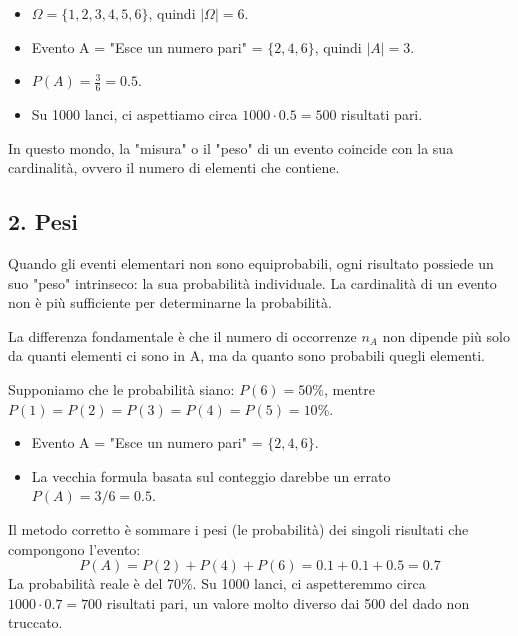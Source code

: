 \begin{esempio}
    \begin{itemize}
        \item \(\Omega = \{1, 2, 3, 4, 5, 6\}\), quindi \(|\Omega| = 6\).
        \item Evento A = "Esce un numero pari" = \(\{2, 4, 6\}\), quindi \(|A| = 3\).
        \item \(P(A) = \frac{3}{6} = 0.5\).
        \item Su 1000 lanci, ci aspettiamo circa \(1000 \cdot 0.5 = 500\) risultati pari.
    \end{itemize}
\end{esempio}
In questo mondo, la "misura" o il "peso" di un evento coincide con la sua cardinalità, ovvero il numero di elementi che contiene.

\subsection*{2. Pesi}

Quando gli eventi elementari non sono equiprobabili, ogni risultato possiede un suo "peso" intrinseco: la sua probabilità individuale. La cardinalità di un evento non è più sufficiente per determinarne la probabilità.

La differenza fondamentale è che il numero di occorrenze \(n_A\) non dipende più solo da quanti elementi ci sono in A, ma da quanto sono probabili quegli elementi.

\begin{esempio}
    Supponiamo che le probabilità siano: \(P(6) = 50\%\), mentre \(P(1) = P(2) = P(3) = P(4) = P(5) = 10\%\).
    \begin{itemize}
        \item Evento A = "Esce un numero pari" = \(\{2, 4, 6\}\).
        \item La vecchia formula basata sul conteggio darebbe un errato \(P(A) = 3/6 = 0.5\).
    \end{itemize}
    Il metodo corretto è sommare i pesi (le probabilità) dei singoli risultati che compongono l'evento:
    \[ P(A) = P(2) + P(4) + P(6) = 0.1 + 0.1 + 0.5 = 0.7 \]
    La probabilità reale è del 70\%. Su 1000 lanci, ci aspetteremmo circa \(1000 \cdot 0.7 = 700\) risultati pari, un valore molto diverso dai 500 del dado non truccato.
\end{esempio}

